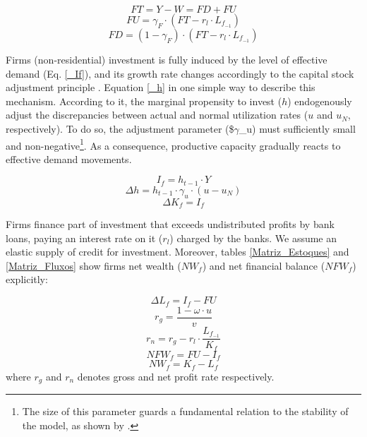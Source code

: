 \documentclass[11pt]{article}
\begin{document}
\begin{equation}
\label{_FT}
    FT = Y - W = FD + FU
\end{equation}
\begin{equation}
    FU = \gamma_F\cdot (FT - r_l\cdot L_{f_{-1}})
\end{equation}
\begin{equation}
    FD = (1-\gamma_F)\cdot (FT - r_l\cdot L_{f_{-1}})
\end{equation}

Firms (non-residential) investment is fully induced by the level of effective demand (Eq. \ref{_If}), and its growth rate changes accordingly to the capital stock adjustment principle \cite{freitas_growth_2015}.
Equation \ref{_h} in one simple way to describe this mechanism.
According to it, the marginal propensity to invest (\(h\)) endogenously adjust the discrepancies between actual and normal utilization rates (\(u\) and \(u_N\), respectively). To do so, the adjustment parameter (\$\(\gamma\)\_u) must sufficiently small and non-negative\footnote{The size of this parameter guards a fundamental relation to the stability of the model, as shown by \textcite{freitas_growth_2015}.}. 
As a consequence, productive capacity gradually reacts to effective demand movements.

\begin{equation}
\label{_If}
    I_f = h_{t-1}\cdot Y
\end{equation}
\begin{equation}
\label{_h}
    \Delta h = h_{t-1}\cdot \gamma_u\cdot (u - u_N)
\end{equation}
\begin{equation}
    \Delta K_f = I_f
\end{equation}


Firms finance part of investment that exceeds undistributed profits by bank loans, paying an interest rate on it (\(r_l\)) charged by the banks. 
We assume an elastic supply of credit for investment. 
Moreover, tables \ref{Matriz_Estoques} and \ref{Matriz_Fluxos} show firms net wealth (\(NW_f\)) and net financial balance (\(NFW_f\)) explicitly:

\begin{equation}
\label{_Lf}
    \Delta L_f = I_f - FU
\end{equation}
$$
r_g = \frac{1-\omega\cdot u}{v}
$$
$$
r_n = r_g - r_l\cdot\frac{L_{f_{-1}}}{K_f}
$$
\begin{equation}
    NFW_f = FU - I_f
\end{equation}
\begin{equation}
    NW_f = K_f - L_f
\end{equation}
where \(r_g\) and \(r_n\) denotes gross and net profit rate respectively.
\end{document}
